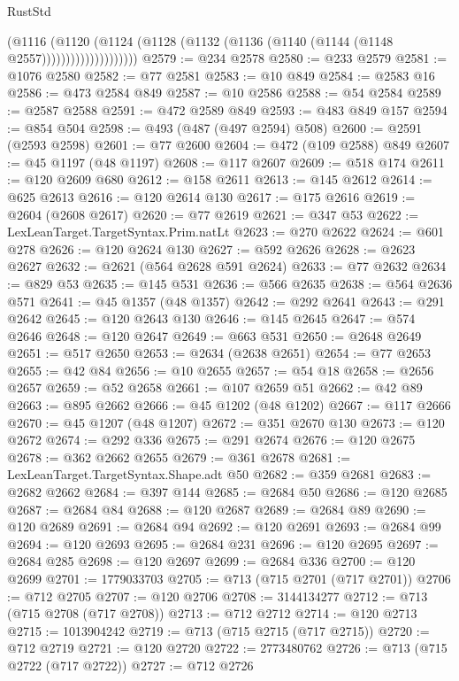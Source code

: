 \begin{lexlean}{RustStd}
\begin{coremodule}
                          (@1116
                            (@1120
                              (@1124
                                (@1128 (@1132 (@1136 (@1140 (@1144 (@1148 @2557))))))))))))))))))))
@2579 := @234 @2578
@2580 := @233 @2579
@2581 := @1076 @2580
@2582 := @77 @2581
@2583 := @10 @849
@2584 := @2583 @16
@2586 := @473 @2584 @849
@2587 := @10 @2586
@2588 := @54 @2584
@2589 := @2587 @2588
@2591 := @472 @2589 @849
@2593 := @483 @849 @157
@2594 := @854 @504
@2598 := @493 (@487 (@497 @2594) @508)
@2600 := @2591 (@2593 @2598)
@2601 := @77 @2600
@2604 := @472 (@109 @2588) @849
@2607 := @45 @1197 (@48 @1197)
@2608 := @117 @2607
@2609 := @518 @174
@2611 := @120 @2609 @680
@2612 := @158 @2611
@2613 := @145 @2612
@2614 := @625 @2613
@2616 := @120 @2614 @130
@2617 := @175 @2616
@2619 := @2604 (@2608 @2617)
@2620 := @77 @2619
@2621 := @347 @53
@2622 := LexLeanTarget.TargetSyntax.Prim.natLt
@2623 := @270 @2622
@2624 := @601 @278
@2626 := @120 @2624 @130
@2627 := @592 @2626
@2628 := @2623 @2627
@2632 := @2621 (@564 @2628 @591 @2624)
@2633 := @77 @2632
@2634 := @829 @53
@2635 := @145 @531
@2636 := @566 @2635
@2638 := @564 @2636 @571
@2641 := @45 @1357 (@48 @1357)
@2642 := @292 @2641
@2643 := @291 @2642
@2645 := @120 @2643 @130
@2646 := @145 @2645
@2647 := @574 @2646
@2648 := @120 @2647
@2649 := @663 @531
@2650 := @2648 @2649
@2651 := @517 @2650
@2653 := @2634 (@2638 @2651)
@2654 := @77 @2653
@2655 := @42 @84
@2656 := @10 @2655
@2657 := @54 @18
@2658 := @2656 @2657
@2659 := @52 @2658
@2661 := @107 @2659 @51
@2662 := @42 @89
@2663 := @895 @2662
@2666 := @45 @1202 (@48 @1202)
@2667 := @117 @2666
@2670 := @45 @1207 (@48 @1207)
@2672 := @351 @2670 @130
@2673 := @120 @2672
@2674 := @292 @336
@2675 := @291 @2674
@2676 := @120 @2675
@2678 := @362 @2662 @2655
@2679 := @361 @2678
@2681 := LexLeanTarget.TargetSyntax.Shape.adt @50
@2682 := @359 @2681
@2683 := @2682 @2662
@2684 := @397 @144
@2685 := @2684 @50
@2686 := @120 @2685
@2687 := @2684 @84
@2688 := @120 @2687
@2689 := @2684 @89
@2690 := @120 @2689
@2691 := @2684 @94
@2692 := @120 @2691
@2693 := @2684 @99
@2694 := @120 @2693
@2695 := @2684 @231
@2696 := @120 @2695
@2697 := @2684 @285
@2698 := @120 @2697
@2699 := @2684 @336
@2700 := @120 @2699
@2701 := 1779033703
@2705 := @713 (@715 @2701 (@717 @2701))
@2706 := @712 @2705
@2707 := @120 @2706
@2708 := 3144134277
@2712 := @713 (@715 @2708 (@717 @2708))
@2713 := @712 @2712
@2714 := @120 @2713
@2715 := 1013904242
@2719 := @713 (@715 @2715 (@717 @2715))
@2720 := @712 @2719
@2721 := @120 @2720
@2722 := 2773480762
@2726 := @713 (@715 @2722 (@717 @2722))
@2727 := @712 @2726

\end{coremodule}
\end{lexlean}
